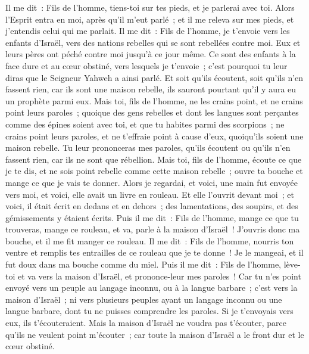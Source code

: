 \begin{multicols}{2}
\VerseOne{}Il me dit~: Fils de l'homme, tiens-toi sur tes pieds, et je parlerai avec toi.
Alors l'Esprit entra en moi, après qu'il m'eut parlé~; et il me releva sur mes pieds, et j'entendis celui qui me parlait.
Il me dit~: Fils de l'homme, je t'envoie vers les enfants d'Israël, vers des nations rebelles qui se sont rebellées contre moi. Eux et leurs pères ont péché contre moi jusqu'à ce jour même.
Ce sont des enfants à la face dure et au cœur obstiné, vers lesquels je t'envoie~; c'est pourquoi tu leur diras que le Seigneur Yahweh a ainsi parlé.
Et soit qu'ils écoutent, soit qu'ils n'en fassent rien, car ils sont une maison rebelle, ils sauront pourtant qu'il y aura eu un prophète parmi eux.
Mais toi, fils de l'homme, ne les crains point, et ne crains point leurs paroles~; quoique des gens rebelles et dont les langues sont perçantes comme des épines soient avec toi, et que tu habites parmi des scorpions~; ne crains point leurs paroles, et ne t'effraie point à cause d'eux, quoiqu'ils soient une maison rebelle.
Tu leur prononceras mes paroles, qu'ils écoutent ou qu'ils n'en fassent rien, car ils ne sont que rébellion.
Mais toi, fils de l'homme, écoute ce que je te dis, et ne sois point rebelle comme cette maison rebelle~; ouvre ta bouche et mange ce que je vais te donner.
Alors je regardai, et voici, une main fut envoyée vers moi, et voici, elle avait un livre en rouleau.
Et elle l'ouvrit devant moi~; et voici, il était écrit en dedans et en dehors~; des lamentations, des soupirs, et des gémissements y étaient écrits.
\VerseOne{}Puis il me dit~: Fils de l'homme, mange ce que tu trouveras, mange ce rouleau, et va, parle à la maison d'Israël~!
J'ouvris donc ma bouche, et il me fit manger ce rouleau.
Il me dit~: Fils de l'homme, nourris ton ventre et remplis tes entrailles de ce rouleau que je te donne~! Je le mangeai, et il fut doux dans ma bouche comme du miel.
Puis il me dit~: Fils de l'homme, lève-toi et va vers la maison d'Israël, et prononce-leur mes paroles~!
Car tu n'es point envoyé vers un peuple au langage inconnu, ou à la langue barbare~; c'est vers la maison d'Israël~;
ni vers plusieurs peuples ayant un langage inconnu ou une langue barbare, dont tu ne puisses comprendre les paroles. Si je t'envoyais vers eux, ils t'écouteraient.
Mais la maison d'Israël ne voudra pas t'écouter, parce qu'ils ne veulent point m'écouter~; car toute la maison d'Israël a le front dur et le cœur obstiné.

\end{multicols}
